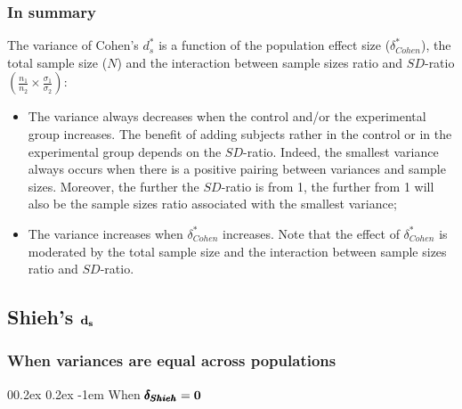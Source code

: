 \documentclass[
  english,
  man]{apa6}
\makeatletter
\providecommand{\tightlist}{%
  \setlength{\itemsep}{0pt}\setlength{\parskip}{0pt}}
\let\oldparagraph\paragraph
\renewcommand{\paragraph}[1]{\oldparagraph{#1}\mbox{}}
\renewcommand{\paragraph}{\@startsection{paragraph}{4}{\parindent}%
  {0\baselineskip \@plus 0.2ex \@minus 0.2ex}%
  {-1em}%
  {\normalfont\normalsize\bfseries\itshape\typesectitle}}
\makeatother
\begin{document}
\hypertarget{in-summary-2}{%
\subsubsection{In summary}\label{in-summary-2}}

The variance of Cohen's \(d^*_s\) is a function of the population effect size (\(\delta^*_{Cohen}\)), the total sample size (\(N\)) and the interaction between sample sizes ratio and \(SD\)-ratio \(\left(\frac{n_1}{n_2}\times\frac{\sigma_1}{\sigma_2} \right)\):

\begin{itemize}
\tightlist
\item
  The variance always decreases when the control and/or the experimental group increases. The benefit of adding subjects rather in the control or in the experimental group depends on the \(SD\)-ratio. Indeed, the smallest variance always occurs when there is a positive pairing between variances and sample sizes. Moreover, the further the \(SD\)-ratio is from 1, the further from 1 will also be the sample sizes ratio associated with the smallest variance;\\
\item
  The variance increases when \(\delta^*_{Cohen}\) increases. Note that the effect of \(\delta^*_{Cohen}\) is moderated by the total sample size and the interaction between sample sizes ratio and \(SD\)-ratio.
\end{itemize}

\hypertarget{shiehs-bf-d_s}{%
\subsection{\texorpdfstring{Shieh's \(\bf d_s\)}{Shieh's \textbackslash bf d\_s}}\label{shiehs-bf-d_s}}

\hypertarget{when-variances-are-equal-across-populations-3}{%
\subsubsection{When variances are equal across populations}\label{when-variances-are-equal-across-populations-3}}

\hypertarget{when-bf-pmbdelta_shieh0}{%
\paragraph{\texorpdfstring{When \(\bf \pmb{\delta_{Shieh}}=0\)}{When \textbackslash bf \textbackslash pmb\{\textbackslash delta\_\{Shieh\}\}=0}}\label{when-bf-pmbdelta_shieh0}}
\end{document}
